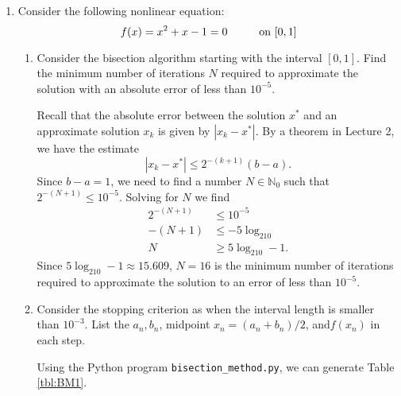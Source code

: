 \documentclass[11pt,oneside,english,reqno]{amsart}
\theoremstyle{definition}
\newcommand{\pspace}{\hspace{10mm}}
\newcommand{\MB}[1]{\mathbb{#1}}
\newcommand{\1}{\mathbbm{1}}
\begin{document}
\rightline{\today}




\begin{enumerate}[leftmargin=*]
\itemsep5mm



\item Consider the following nonlinear equation:
\[
f(x)=x^2+x-1=0\pspace\text{on }[0,1]
\]
\begin{enumerate}
\itemsep5mm
\item Consider the bisection algorithm starting with the interval $[0,1]$. Find the minimum number of iterations $N$ required to approximate the solution with an absolute error of less than $10^{-5}$.

Recall that the absolute error between the solution $x^*$ and an approximate solution $x_k$ is given by $|x_k-x^*|$. By a theorem in Lecture 2, we have the estimate
\[
|x_k-x^*|\leq2^{-(k+1)}(b-a).
\]
Since $b-a=1$, we need to find a number $N\in\MB{N}_0$ such that $2^{-(N+1)}\leq10^{-5}$. Solving for $N$ we find
\begin{align*}
2^{-(N+1)}&\leq10^{-5}\\[2mm]
-(N+1)&\leq-5\log_210\\[2mm]
N&\geq5\log_210-1.
\end{align*}
Since $5\log_210-1\approx15.609$, $N=16$ is the minimum number of iterations required to approximate the solution to an error of less than $10^{-5}$.

\item Consider the stopping criterion as when the interval length is smaller than $10^{-3}$. List the $a_n,b_n$, midpoint $x_n=(a_n+b_n)/2$, and$ f(x_n)$ in each step.

Using the Python program \verb!bisection_method.py!, we can generate Table \ref{tbl:BM1}.


\end{enumerate}
\end{enumerate}
\end{document}
